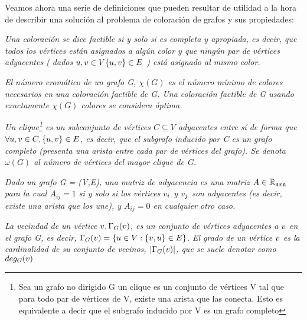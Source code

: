 \documentclass[12pt]{report}
\begin{document}
Veamos ahora una serie de definiciones que pueden resultar de utilidad a la hora de describir una solución al problema de coloración de grafos y sus propiedades:

\begin{thm}
\textsl{Una coloración se dice factible si y solo si es completa y apropiada, es decir, que todos los vértices están asignados a algún color y que ningún par de vértices adyacentes ( dados $ \mathnormal{u,v} \in V \{ \mathnormal{u,v} \} \in E $ ) está asignado al mismo color.}
\end{thm}

\begin{thm}
\textsl{El número cromático de un grafo G, $\chi (G)$ es el número mínimo de colores necesarios en una coloración factible de G. Una coloración factible de G usando exactamente $\chi (G)$ colores se considera óptima.}
\end{thm}

\begin{thm}
\textsl{Un clique\footnote{Sea un grafo no dirigido G un clique es un conjunto de vértices V tal que para todo par de vértices de V, existe una arista que las conecta. Esto es equivalente a decir que el subgrafo inducido por V es un grafo completo} es un subconjunto de vértices $C \subseteq V$ adyacentes entre sí de forma que $\forall \mathnormal{u,v} \in C, \{\mathnormal{u,v}\} \in E$, es decir, que el subgrafo inducido por C es un grafo completo (presenta una arista entre cada par de vértices del grafo). Se denota $\omega (G)$ al número de vértices del mayor clique de G.}
\end{thm}

\begin{thm}
\textsl{Dado un grafo G = (V,E), una matriz de adyacencia es una matriz $ A \in \mathbb{R}_{\mathfrak{n}\mathnormal{x}\mathfrak{n}}$ para la cual $A_{ij} = 1$ si y solo si los vértices $\mathnormal{v}_i$ y $\mathnormal{v}_j$ son adyacentes (es decir, existe una arista que los une), y $A_{ij} = 0$ en cualquier otro caso.}
\end{thm}

\begin{thm}
\textsl{La vecindad de un vértice $\mathnormal{v} , \Gamma_G (\mathnormal{v})$, es un conjunto de vértices adyacentes a $\mathnormal{v}$ en el grafo G, es decir, $\Gamma_G (\mathnormal{v}) = \{  \mathnormal{u} \in V : \{ \mathnormal{v,u} \} \in E \}$. El grado de un vértice $\mathnormal{v}$ es la cardinalidad de su conjunto de vecinos, $\lvert\Gamma_G (\mathnormal{v})\rvert$, que se suele denotar como $deg_G(\mathnormal{v})$}
\end{thm}
\end{document}
